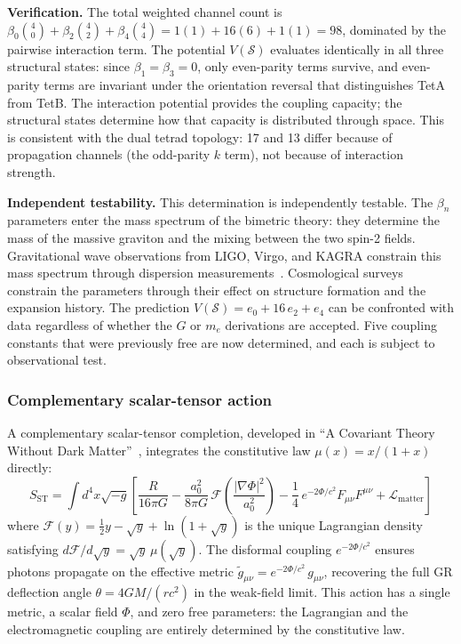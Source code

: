 \documentclass[aps,prd,preprint,superscriptaddress,showpacs,preprintnumbers,amsmath,amssymb,nofootinbib]{revtex4-2}
\begin{document}
\textbf{Verification.} The total weighted channel count is $\beta_0\binom{4}{0} + \beta_2\binom{4}{2} + \beta_4\binom{4}{4} = 1(1) + 16(6) + 1(1) = 98$, dominated by the pairwise interaction term. The potential $V(\mathcal{S})$ evaluates identically in all three structural states: since $\beta_1 = \beta_3 = 0$, only even-parity terms survive, and even-parity terms are invariant under the orientation reversal that distinguishes TetA from TetB. The interaction potential provides the coupling capacity; the structural states determine how that capacity is distributed through space. This is consistent with the dual tetrad topology: 17 and 13 differ because of propagation channels (the odd-parity $k$ term), not because of interaction strength.

\textbf{Independent testability.} This determination is independently testable. The $\beta_n$ parameters enter the mass spectrum of the bimetric theory: they determine the mass of the massive graviton and the mixing between the two spin-2 fields. Gravitational wave observations from LIGO, Virgo, and KAGRA constrain this mass spectrum through dispersion measurements~\cite{gw170817}. Cosmological surveys constrain the parameters through their effect on structure formation and the expansion history. The prediction $V(\mathcal{S}) = e_0 + 16\,e_2 + e_4$ can be confronted with data regardless of whether the $G$ or $m_e$ derivations are accepted. Five coupling constants that were previously free are now determined, and each is subject to observational test.

\subsubsection*{Complementary scalar-tensor action}

A complementary scalar-tensor completion, developed in ``A Covariant Theory Without Dark Matter''~\cite{paper2}, integrates the constitutive law $\mu(x) = x/(1+x)$ directly:
\begin{equation}
S_{\text{ST}} = \int d^4x \sqrt{-g} \left[ \frac{R}{16\pi G} - \frac{a_0^2}{8\pi G}\,\mathcal{F}\!\left(\frac{|\nabla\Phi|^2}{a_0^2}\right) - \frac{1}{4}\,e^{-2\Phi/c^2} F_{\mu\nu}F^{\mu\nu} + \mathcal{L}_{\text{matter}} \right]
\label{eq:scalar-tensor}
\end{equation}
where $\mathcal{F}(y) = \tfrac{1}{2}y - \sqrt{y} + \ln(1 + \sqrt{y})$ is the unique Lagrangian density satisfying $d\mathcal{F}/d\sqrt{y} = \sqrt{y}\,\mu(\sqrt{y})$. The disformal coupling $e^{-2\Phi/c^2}$ ensures photons propagate on the effective metric $\tilde{g}_{\mu\nu} = e^{-2\Phi/c^2}\,g_{\mu\nu}$, recovering the full GR deflection angle $\theta = 4GM/(rc^2)$ in the weak-field limit. This action has a single metric, a scalar field $\Phi$, and zero free parameters: the Lagrangian and the electromagnetic coupling are entirely determined by the constitutive law.
\end{document}
